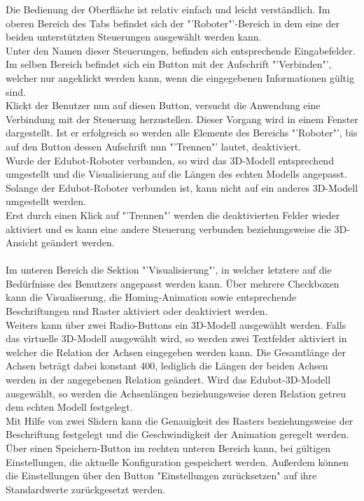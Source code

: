 Die Bedienung der Oberfläche ist relativ einfach und leicht verständlich. Im oberen Bereich des Tabs befindet sich der "'Roboter"'-Bereich in dem eine der beiden unterstützten Steuerungen ausgewählt werden kann.\\ 
Unter den Namen dieser Steuerungen, befinden sich entsprechende Eingabefelder. Im selben Bereich befindet sich ein Button mit der Aufschrift "'Verbinden"', welcher nur angeklickt werden kann, wenn die eingegebenen Informationen gültig sind.\\
Klickt der Benutzer nun auf diesen Button, versucht die Anwendung eine Verbindung mit der Steuerung herzustellen. Dieser Vorgang wird in einem Fenster dargestellt. Ist er erfolgreich so werden alle Elemente des Bereichs "'Roboter"', bis auf den Button dessen Aufschrift nun "'Trennen"' lautet, deaktiviert. \\
Wurde der Edubot-Roboter verbunden, so wird das 3D-Modell entsprechend umgestellt und die Visualisierung auf die Längen des echten Modells angepasst. Solange der Edubot-Roboter verbunden ist, kann nicht auf ein anderes 3D-Modell umgestellt werden.\\
Erst durch einen Klick auf "'Trennen"' werden die deaktivierten Felder wieder aktiviert und es kann eine andere Steuerung verbunden beziehungsweise die 3D-Ansicht geändert werden.\\
\\
Im unteren Bereich die Sektion "'Visualisierung"', in welcher letztere auf die Bedürfnisse des Benutzers angepasst werden kann. Über mehrere Checkboxen kann die Visualiserung, die Homing-Animation sowie entsprechende Beschriftungen und Raster aktiviert oder deaktiviert werden. \\
Weiters kann über zwei Radio-Buttons ein 3D-Modell ausgewählt werden. Falls das virtuelle 3D-Modell ausgewählt wird, so werden zwei Textfelder aktiviert in welcher die Relation der Achsen eingegeben werden kann. Die Gesamtlänge der Achsen beträgt dabei konstant 400, lediglich die Längen der beiden Achsen werden in der angegebenen Relation geändert. Wird das Edubot-3D-Modell ausgewählt, so werden die Achsenlängen beziehungsweise deren Relation getreu dem echten Modell festgelegt.\\
Mit Hilfe von zwei Slidern kann die Genauigkeit des Rasters beziehungsweise der Beschriftung festgelegt und die Geschwindigkeit der Animation geregelt werden.\\
Über einen Speichern-Button im rechten unteren Bereich kann, bei gültigen Einstellungen, die aktuelle Konfiguration gespeichert werden. Außerdem können die Einstellungen über den Button "Einstellungen zurücksetzen" auf ihre Standardwerte zurückgesetzt werden.

